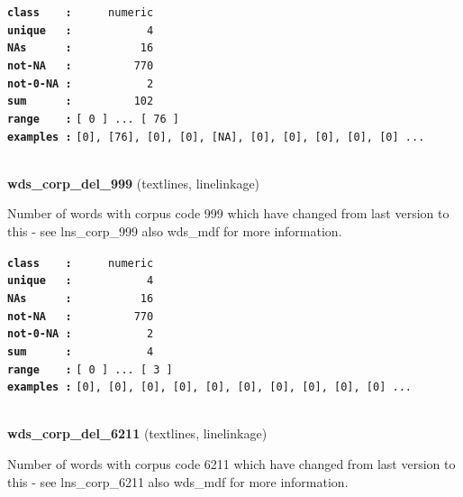 \documentclass[]{article}
\begin{document}
\textbf{\texttt{class\ \ \ \ :}} \texttt{~~~~~numeric}\\
\textbf{\texttt{unique\ \ \ :}} \texttt{~~~~~~~~~~~4}\\
\textbf{\texttt{NAs\ \ \ \ \ \ :}} \texttt{~~~~~~~~~~16}\\
\textbf{\texttt{not-NA\ \ \ :}} \texttt{~~~~~~~~~770}\\
\textbf{\texttt{not-0-NA\ :}} \texttt{~~~~~~~~~~~2}\\
\textbf{\texttt{sum\ \ \ \ \ \ :}} \texttt{~~~~~~~~~102}\\
\textbf{\texttt{range\ \ \ \ :}}
\texttt{{[}\ 0\ {]}\ ...\ {[}\ 76\ {]}}\\
\textbf{\texttt{examples\ :}}
\texttt{{[}0{]},\ {[}76{]},\ {[}0{]},\ {[}0{]},\ {[}NA{]},\ {[}0{]},\ {[}0{]},\ {[}0{]},\ {[}0{]},\ {[}0{]}\ ...}\\

~

\textbf{wds\_corp\_del\_999} (textlines, linelinkage)

Number of words with corpus code 999 which have changed from last
version to this - see lns\_corp\_999 also wds\_mdf for more information.

\textbf{\texttt{class\ \ \ \ :}} \texttt{~~~~~numeric}\\
\textbf{\texttt{unique\ \ \ :}} \texttt{~~~~~~~~~~~4}\\
\textbf{\texttt{NAs\ \ \ \ \ \ :}} \texttt{~~~~~~~~~~16}\\
\textbf{\texttt{not-NA\ \ \ :}} \texttt{~~~~~~~~~770}\\
\textbf{\texttt{not-0-NA\ :}} \texttt{~~~~~~~~~~~2}\\
\textbf{\texttt{sum\ \ \ \ \ \ :}} \texttt{~~~~~~~~~~~4}\\
\textbf{\texttt{range\ \ \ \ :}}
\texttt{{[}\ 0\ {]}\ ...\ {[}\ 3\ {]}}\\
\textbf{\texttt{examples\ :}}
\texttt{{[}0{]},\ {[}0{]},\ {[}0{]},\ {[}0{]},\ {[}0{]},\ {[}0{]},\ {[}0{]},\ {[}0{]},\ {[}0{]},\ {[}0{]}\ ...}\\

~

\textbf{wds\_corp\_del\_6211} (textlines, linelinkage)

Number of words with corpus code 6211 which have changed from last
version to this - see lns\_corp\_6211 also wds\_mdf for more
information.
\end{document}
